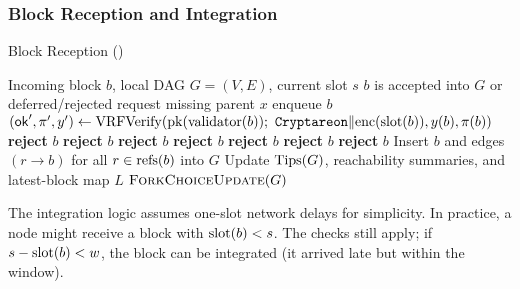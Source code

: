 \subsubsection{Block Reception and Integration}
\begin{algorithm}[H]
\caption{Block Reception (\ProjBase)}
\label{alg:block-reception}
\begin{algorithmic}[1]
\Require Incoming block $b$, local DAG $G=(V,E)$, current slot $s$
\Ensure $b$ is accepted into $G$ or deferred/rejected
 \Return \EndIf
{}
      \State request missing parent $x$
   \EndFor
   \State enqueue $b$ 
   \State \Return
\EndIf
\State $(\mathsf{ok}',\pi',y') \gets \mathrm{VRFVerify}(\mathrm{pk}(\mathrm{validator}(b));\ \mathtt{Cryptareon}\|\mathrm{enc}(\mathrm{slot}(b)), y(b), \pi(b))$
  \State \textbf{reject} $b$ 
\EndIf
{}
   \State \textbf{reject} $b$ 
\EndIf
{} 
  \State \textbf{reject} $b$ 
\EndIf
{}
  \State \textbf{reject} $b$ 
\EndIf
{}
  \State \textbf{reject} $b$ 
\EndIf
{}
  \State \textbf{reject} $b$ 
\EndIf
{}
  \State \textbf{reject} $b$ 
\EndIf
\State Insert $b$ and edges $(r \to b)$ for all $r\in\mathrm{refs}(b)$ into $G$
\State Update $\mathrm{Tips}(G)$, reachability summaries, and latest-block map $L$
\State $\textsc{ForkChoiceUpdate}(G)$
\end{algorithmic}
\end{algorithm}

\begin{remark}
The integration logic assumes one-slot network delays for simplicity. In practice, a node might receive a block with $\mathrm{slot}(b) < s$. The checks still apply; if $s-\mathrm{slot}(b) < w$, the block can be integrated (it arrived late but within the window).
\end{remark}

